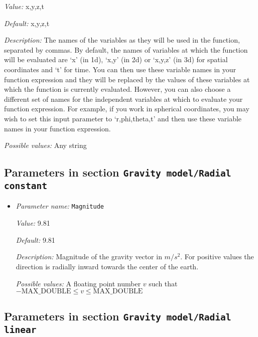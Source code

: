 \begin{itemize}
{\it Value:} x,y,z,t


{\it Default:} x,y,z,t


{\it Description:} The names of the variables as they will be used in the function, separated by commas. By default, the names of variables at which the function will be evaluated are `x' (in 1d), `x,y' (in 2d) or `x,y,z' (in 3d) for spatial coordinates and `t' for time. You can then use these variable names in your function expression and they will be replaced by the values of these variables at which the function is currently evaluated. However, you can also choose a different set of names for the independent variables at which to evaluate your function expression. For example, if you work in spherical coordinates, you may wish to set this input parameter to `r,phi,theta,t' and then use these variable names in your function expression.


{\it Possible values:} Any string
\end{itemize}

\subsection{Parameters in section \tt Gravity model/Radial constant}
\label{parameters:Gravity_20model/Radial_20constant}

\begin{itemize}
\item {\it Parameter name:} {\tt Magnitude}
\label{parameters:Gravity model/Radial constant/Magnitude}
\label{parameters:Gravity_20model/Radial_20constant/Magnitude}


{\it Value:} 9.81


{\it Default:} 9.81


{\it Description:} Magnitude of the gravity vector in $m/s^2$. For positive values the direction is radially inward towards the center of the earth.


{\it Possible values:} A floating point number $v$ such that $-\text{MAX\_DOUBLE} \leq v \leq \text{MAX\_DOUBLE}$
\end{itemize}

\subsection{Parameters in section \tt Gravity model/Radial linear}
\label{parameters:Gravity_20model/Radial_20linear}

